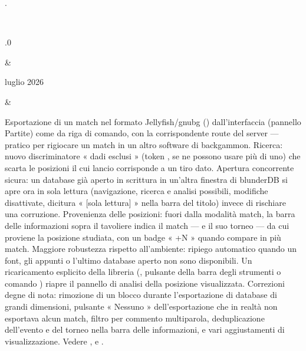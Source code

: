 \documentclass[letterpaper,10pt,italian]{sphinxmanual}
\begin{document}
\begin{savenotes}
\begin{longtable}{}
\begin{varwidth}[t]{}
{\hyperref[\detokenize{telecharge_install:telecharge-install}]{}}.
\sphinxbeforeendvarwidth
\end{varwidth}%
\\
\sphinxhline\begin{varwidth}[t]{}
.0
\sphinxbeforeendvarwidth
\end{varwidth}%
&\begin{varwidth}[t]{}
 luglio 2026
\sphinxbeforeendvarwidth
\end{varwidth}%
&\begin{varwidth}[t]{}
\sphinxAtStartPar
Esportazione di un match nel formato Jellyfish/gnubg () dall’interfaccia (pannello Partite) come da riga di comando, con la corrispondente route del server — pratico per rigiocare un match in un altro software di backgammon. Ricerca: nuovo discriminatore « dadi esclusi » (token , se ne possono usare più di uno) che scarta le posizioni il cui lancio corrisponde a un tiro dato. Apertura concorrente sicura: un database già aperto in scrittura in un’altra finestra di blunderDB si apre ora in sola lettura (navigazione, ricerca e analisi possibili, modifiche disattivate, dicitura « {[}sola lettura{]} » nella barra del titolo) invece di rischiare una corruzione. Provenienza delle posizioni: fuori dalla modalità match, la barra delle informazioni sopra il tavoliere indica il match — e il suo torneo — da cui proviene la posizione studiata, con un badge « +N » quando compare in più match. Maggiore robustezza rispetto all’ambiente: ripiego automatico quando un font, gli appunti o l’ultimo database aperto non sono disponibili. Un ricaricamento esplicito della libreria (, pulsante della barra degli strumenti o comando ) riapre il pannello di analisi della posizione visualizzata. Correzioni degne di nota: rimozione di un blocco durante l’esportazione di database di grandi dimensioni, pulsante « Nessuno » dell’esportazione che in realtà non esportava alcun match, filtro per commento multi\sphinxhyphen{}parola, deduplicazione dell’evento e del torneo nella barra delle informazioni, e vari aggiustamenti di visualizzazione. Vedere {\hyperref[\detokenize{cmd_mode:cmd-mode}]{}}, {\hyperref[\detokenize{manuel:panneau-matchs}]{}} e {\hyperref[\detokenize{manuel:manuel}]{}}.

\end{varwidth}
\end{longtable}
\end{savenotes}
\end{document}
